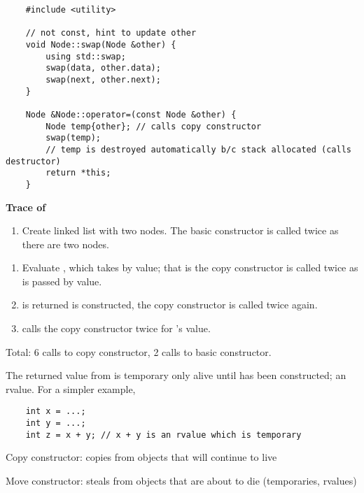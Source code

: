 \begin{lstlisting}
    #include <utility>

    // not const, hint to update other
    void Node::swap(Node &other) {
        using std::swap;
        swap(data, other.data);
        swap(next, other.next);
    }

    Node &Node::operator=(const Node &other) {
        Node temp{other}; // calls copy constructor
        swap(temp);
        // temp is destroyed automatically b/c stack allocated (calls destructor)
        return *this;
    }
\end{lstlisting}



\textbf{Trace of} 

\begin{enumerate}[label=(\arabic*)]
    \item Create linked list with two nodes. The basic constructor is called twice
          as there are two nodes.
\end{enumerate}

\begin{enumerate}[label=(\arabic*)]
    \item Evaluate , which takes  by value; that is
          the copy constructor is called twice as  is passed by value.
    \item {} is returned  is constructed, the copy constructor
          is called twice again.
    \item {} calls the copy constructor twice for 's value.
\end{enumerate}

Total: 6 calls to copy constructor, 2 calls to basic constructor.

The returned value from  is temporary only alive until 
has been constructed; an rvalue. For a simpler example,
\begin{lstlisting}
    int x = ...;
    int y = ...;
    int z = x + y; // x + y is an rvalue which is temporary
\end{lstlisting}

Copy constructor: copies from objects that will continue to live

Move constructor: steals from objects that are about to die (temporaries, rvalues)


